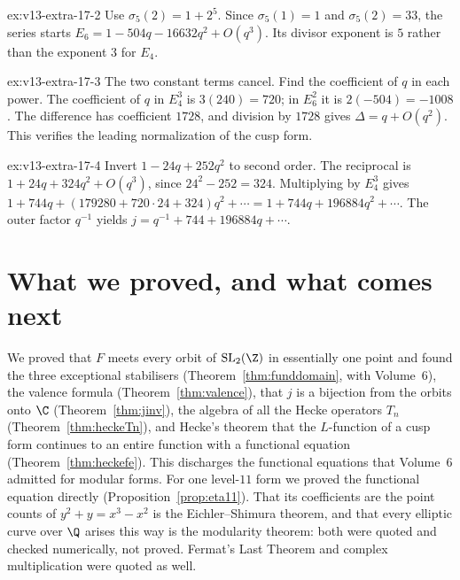 \begin{solution}{ex:v13-extra-17-2}
\idea Use $\sigma_5(2)=1+2^5$.
\writeup Since $\sigma_5(1)=1$ and $\sigma_5(2)=33$, the series starts $E_6=1-504q-16632q^2+O(q^3)$. Its divisor exponent is $5$ rather than the exponent $3$ for $E_4$.
\end{solution}

\begin{solution}{ex:v13-extra-17-3}
\idea The two constant terms cancel. Find the coefficient of $q$ in each power.
\writeup The coefficient of $q$ in $E_4^3$ is $3(240)=720$; in $E_6^2$ it is $2(-504)=-1008$. The difference has coefficient $1728$, and division by $1728$ gives $\Delta=q+O(q^2)$. This verifies the leading normalization of the cusp form.
\end{solution}

\begin{solution}{ex:v13-extra-17-4}
\idea Invert $1-24q+252q^2$ to second order.
\writeup The reciprocal is $1+24q+324q^2+O(q^3)$, since $24^2-252=324$. Multiplying by $E_4^3$ gives $1+744q+(179280+720\cdot24+324)q^2+\cdots=1+744q+196884q^2+\cdots$. The outer factor $q^{-1}$ yields $j=q^{-1}+744+196884q+\cdots$.
\end{solution}

\section{What we proved, and what comes next}

We proved that $F$ meets every orbit of $\mathrm{SL}_2(\Z)$ in essentially one point and found the three exceptional stabilisers (Theorem~\ref{thm:funddomain}, with
Volume~6), the valence formula (Theorem~\ref{thm:valence}), that $j$ is a bijection from the orbits onto $\C$ (Theorem~\ref{thm:jinv}), the algebra of all the Hecke
operators $T_n$ (Theorem~\ref{thm:heckeTn}), and Hecke's theorem that the $L$-function of a cusp form continues to an entire function with a functional equation
(Theorem~\ref{thm:heckefe}). This discharges the functional equations that Volume~6 admitted for modular forms. For one level-$11$ form we proved the functional
equation directly (Proposition~\ref{prop:eta11}). That its coefficients are the point counts of $y^2+y=x^3-x^2$ is the Eichler--Shimura theorem, and that every
elliptic curve over $\Q$ arises this way is the modularity theorem: both were quoted and checked numerically, not proved. Fermat's Last Theorem and complex
multiplication were quoted as well.

